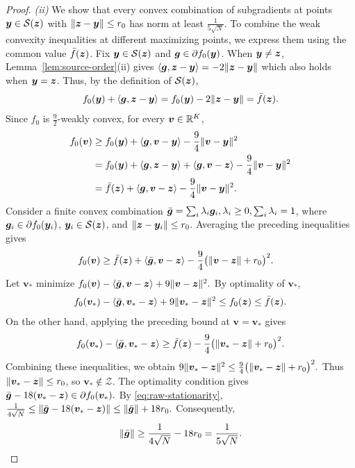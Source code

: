 \begin{proof}
\emph{(ii)}
We show that every convex combination of subgradients
at points $\bm{y}\in\mathcal S(\bm{z})$ with
$\|\bm{z}-\bm{y}\|\le r_0$ has norm at least
$\tfrac1{5\sqrt N}$.
To combine the weak convexity inequalities at
different maximizing points, we express them
using the common value $\bar f(\bm{z})$.
Fix $\bm{y}\in\mathcal S(\bm{z})$ and
$\bm{g}\in\partial f_0(\bm{y})$.
When $\bm{y}\ne\bm{z}$, Lemma~\ref{lem:source-order}(ii)
gives $\langle\bm{g},\bm{z}-\bm{y}\rangle=-2\|\bm{z}-\bm{y}\|$
which  also holds when $\bm{y}=\bm{z}$. 
Thus, by the definition of $\mathcal S(\bm{z})$,
\[
 f_0(\bm{y})+\langle\bm{g},\bm{z}-\bm{y}\rangle
 =f_0(\bm{y})-2\|\bm{z}-\bm{y}\|
 =\bar f(\bm{z}).\]
Since $f_0$ is $\tfrac92$-weakly convex,
for every $\bm v\in{\mathbb{R}}^K$,
\[
\begin{aligned}
 f_0(\bm v)
 &\ge
 f_0(\bm{y})+\langle\bm{g},\bm v-\bm{y}\rangle
 -\frac94\|\bm v-\bm{y}\|^2\\
 &=f_0(\bm{y})+\langle\bm{g},\bm{z}-\bm{y}\rangle
 +\langle\bm{g},\bm v-\bm{z}\rangle
 -\frac94\|\bm v-\bm{y}\|^2\\
 &=\bar f(\bm{z})+\langle\bm{g},\bm v-\bm{z}\rangle
 -\frac94\|\bm v-\bm{y}\|^2.
\end{aligned}
\]
Consider a finite convex combination $ \bar{\bm{g}}=\sum_i\lambda_i\bm{g}_i, \lambda_i\ge0,\sum_i\lambda_i=1$,
where $\bm{g}_i\in\partial f_0(\bm{y}_i)$,
$\bm{y}_i\in\mathcal S(\bm{z})$, and
$\|\bm{z}-\bm{y}_i\|\le r_0$.
Averaging the preceding inequalities gives
\[
\begin{aligned}
 f_0(\bm v)
 &\ge \bar f(\bm{z})+\langle\bar{\bm{g}},\bm v-\bm{z}\rangle
 -\frac94\bigl(\|\bm v-\bm{z}\|+r_0\bigr)^2.
\end{aligned}
\]
Let $\bm v_*$ minimize
$
 f_0(\bm v)-\langle\bar{\bm{g}},\bm v-\bm{z}\rangle
 +9\|\bm v-\bm{z}\|^2.
$ 
By optimality of $\bm v_*$,
\[
 f_0(\bm v_*)-\langle\bar{\bm{g}},\bm v_*-\bm{z}\rangle
 +9\|\bm v_*-\bm{z}\|^2
 \le f_0(\bm{z})\le \bar f(\bm{z}).
\]
On the other hand, applying the preceding bound
at $\bm v=\bm v_*$ gives
\[
 f_0(\bm v_*)-\langle\bar{\bm{g}},\bm v_*-\bm{z}\rangle
 \ge \bar f(\bm{z})
 -\frac94\bigl(\|\bm v_*-\bm{z}\|+r_0\bigr)^2.
\]
Combining these inequalities, we obtain
$
 9\|\bm v_*-\bm{z}\|^2
 \le\tfrac94\bigl(\|\bm v_*-\bm{z}\|+r_0\bigr)^2.
$ 
Thus $\|\bm v_*-\bm{z}\|\le r_0$, so
$\bm v_*\notin\mathcal Z$.
The optimality condition gives
$
 \bar{\bm{g}}-18(\bm v_*-\bm{z})
 \in\partial f_0(\bm v_*).
$ 
By \eqref{eq:raw-stationarity},
$
 \tfrac1{4\sqrt N}
 \le\|\bar{\bm{g}}-18(\bm v_*-\bm{z})\|
 \le\|\bar{\bm{g}}\|+18r_0.
$
Consequently,
\begin{equation}
 \|\bar{\bm{g}}\|
 \ge\frac1{4\sqrt N}-18r_0
 =\frac1{5\sqrt N}.
 \label{eq:near-source-bound}
\end{equation}


\end{proof}
